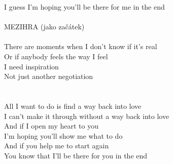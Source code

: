 I guess I'm hoping you'll be there for me in the end\\
\\
MEZIHRA (jako začátek)\\
\\
\color{red}
There are moments when I don't know if it's real\\
Or if anybody feels the way I feel\\
I need inspiration\\
Not just another negotiation\\
\\
\\
\color{black}
All I want to do is find a way back into love\\
I can't make it through without a way back into love\\
And if I open my heart to you\\
I'm hoping you'll show me what to do\\
And if you help me to start again\\
You know that I'll be there for you in the end\\